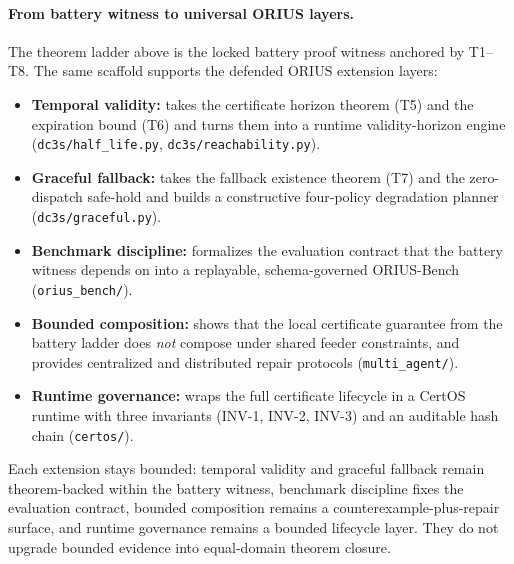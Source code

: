 \paragraph{From battery witness to universal ORIUS layers.}
The theorem ladder above is the locked battery proof witness anchored by
T1--T8.  The same scaffold supports the defended ORIUS extension layers:
\begin{itemize}[leftmargin=*,topsep=2pt,itemsep=1pt]
  \item \textbf{Temporal validity:} takes the certificate horizon
        theorem (T5) and the expiration bound (T6) and turns them into a
        runtime validity-horizon engine
        (\texttt{dc3s/half\_life.py}, \texttt{dc3s/reachability.py}).
  \item \textbf{Graceful fallback:} takes the fallback existence
        theorem (T7) and the zero-dispatch safe-hold and builds a constructive
        four-policy degradation planner (\texttt{dc3s/graceful.py}).
  \item \textbf{Benchmark discipline:} formalizes the evaluation
        contract that the battery witness depends on into a replayable,
        schema-governed ORIUS-Bench (\texttt{orius\_bench/}).
  \item \textbf{Bounded composition:} shows that the local certificate
        guarantee from the battery ladder does \emph{not} compose under shared
        feeder constraints, and provides centralized and distributed repair
        protocols (\texttt{multi\_agent/}).
  \item \textbf{Runtime governance:} wraps the full certificate
        lifecycle in a CertOS runtime with three invariants (INV-1, INV-2,
        INV-3) and an auditable hash chain (\texttt{certos/}).
\end{itemize}
Each extension stays bounded: temporal validity and graceful fallback remain
theorem-backed within the battery witness, benchmark discipline fixes the
evaluation contract, bounded composition remains a counterexample-plus-repair
surface, and runtime governance remains a bounded lifecycle layer.  They do
not upgrade bounded evidence into equal-domain theorem closure.
